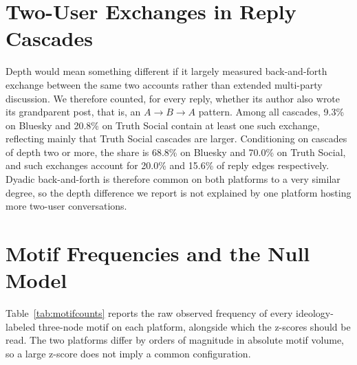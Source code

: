 \documentclass[letterpaper]{article} %
\newcommand{\rev}[1]{{\color{blue}#1}}
\begin{document}
\section{\rev{Two-User Exchanges in Reply Cascades}}

\rev{Depth would mean something different if it largely measured back-and-forth exchange between the same two accounts rather than extended multi-party discussion. We therefore counted, for every reply, whether its author also wrote its grandparent post, that is, an $A \rightarrow B \rightarrow A$ pattern. Among all cascades, 9.3\% on Bluesky and 20.8\% on Truth Social contain at least one such exchange, reflecting mainly that Truth Social cascades are larger. Conditioning on cascades of depth two or more, the share is 68.8\% on Bluesky and 70.0\% on Truth Social, and such exchanges account for 20.0\% and 15.6\% of reply edges respectively. Dyadic back-and-forth is therefore common on both platforms to a very similar degree, so the depth difference we report is not explained by one platform hosting more two-user conversations.}

\section{\rev{Motif Frequencies and the Null Model}}

\rev{Table~\ref{tab:motifcounts} reports the raw observed frequency of every ideology-labeled three-node motif on each platform, alongside which the z-scores should be read. The two platforms differ by orders of magnitude in absolute motif volume, so a large z-score does not imply a common configuration.}
\end{document}

